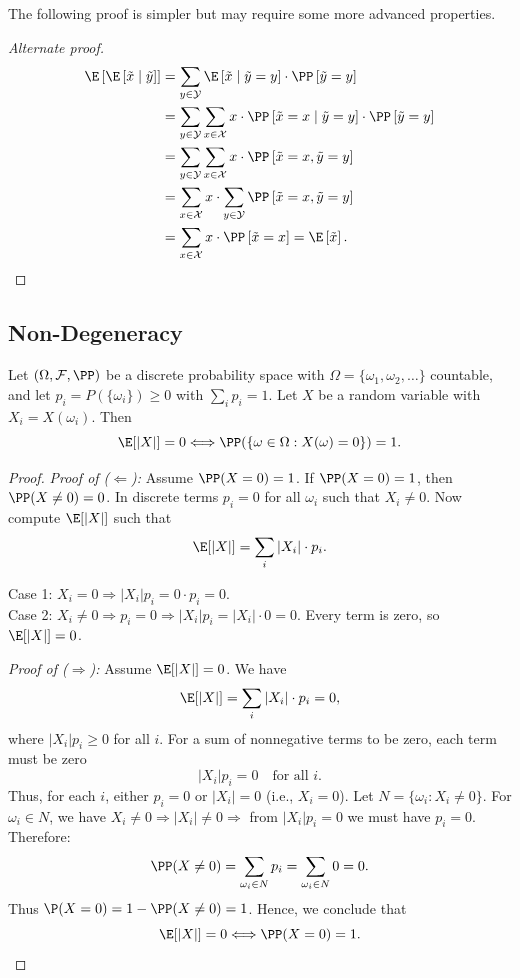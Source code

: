 The following proof is simpler but may require some more advanced properties.
\begin{proof}[Alternate proof]
\begin{align*}
\E\left[\E\left[\tilde{x} \mid  \tilde{y}\right] \right]
&= \sum_{y\in \mathcal{Y}} \E\left[\tilde{x} \mid \tilde{y} = y \right] \cdot \PP\left[ \tilde{y} = y \right]  \\
&= \sum_{y\in \mathcal{Y}} \sum_{x\in \mathcal{X}} x \cdot \PP\left[\tilde{x} = x \mid \tilde{y} = y \right] \cdot \PP\left[ \tilde{y} = y \right]  \\
&= \sum_{y\in \mathcal{Y}} \sum_{x\in \mathcal{X}} x \cdot  \PP\left[\tilde{x} = x, \tilde{y} = y \right]   \\
&=  \sum_{x\in \mathcal{X}} x \cdot \sum_{y\in \mathcal{Y}} \PP\left[\tilde{x} = x, \tilde{y} = y \right]   \\
&=  \sum_{x\in \mathcal{X}} x \cdot  \PP\left[\tilde{x} = x \right]  = \E \left[ \tilde{x} \right].
\end{align*}
\end{proof}


\subsection{Non-Degeneracy}
\begin{theorem} \label{thm:non-degeneracy}
Let $(\Omega,\mathcal{F},\PP)$ be a discrete probability space with $\Omega=\{\omega_1,\omega_2,\ldots\}$ countable, and let $p_i=P(\{\omega_i\})\geq0$ with $\sum_i p_i =1$. Let $X$ be a random variable with $X_i=X(\omega_i)$. Then
\[
\E[|X|]=0 \Longleftrightarrow \PP(\{\omega\in\Omega:X(\omega)=0\})=1.
\]
\end{theorem}

\begin{proof}
\textit{Proof of ($\Leftarrow$):} Assume $\PP(X=0)=1$.
If $\PP(X=0)=1$, then $\PP(X\neq0)=0$.
In discrete terms $p_i=0$ for all $\omega_i$ such that $X_i\neq0$.
Now compute $\E[|X|]$ such that
\[
\E[|X|]=\sum_i |X_i| \cdot p_i.
\]

	Case 1: $X_i=0\Rightarrow |X_i|p_i=0\cdot p_i=0$.\\
	Case 2: $X_i\neq0\Rightarrow p_i=0\Rightarrow |X_i|p_i=|X_i|\cdot0=0$.
Every term is zero, so $\E[|X|]=0$.

\textit{Proof of ($\Rightarrow$):} Assume $\E[|X|]=0$.
We have
\[
\E[|X|]=\sum_i |X_i| \cdot p_i=0,
\]
where $|X_i|p_i\geq0$ for all $i$. For a sum of nonnegative terms to be zero, each term must be zero
\[
|X_i|p_i=0 \quad \text{for all } i.
\]
Thus, for each $i$, either $p_i=0$ or $|X_i|=0$ (i.e., $X_i=0$).
Let $N=\{\omega_i:X_i\neq0\}$.
For $\omega_i\in N$, we have $X_i\neq0\Rightarrow |X_i|\neq0\Rightarrow$ from $|X_i|p_i=0$ we must have $p_i=0$.
Therefore:
\[
\PP(X\neq0)=\sum_{\omega_i\in N} p_i =\sum_{\omega_i\in N} 0=0.
\]
Thus $\P(X=0)=1-\PP(X\neq0)=1$. Hence, we conclude that 
\[
\E[|X|]=0 \Longleftrightarrow \PP(X=0)=1.
\]
\end{proof}


